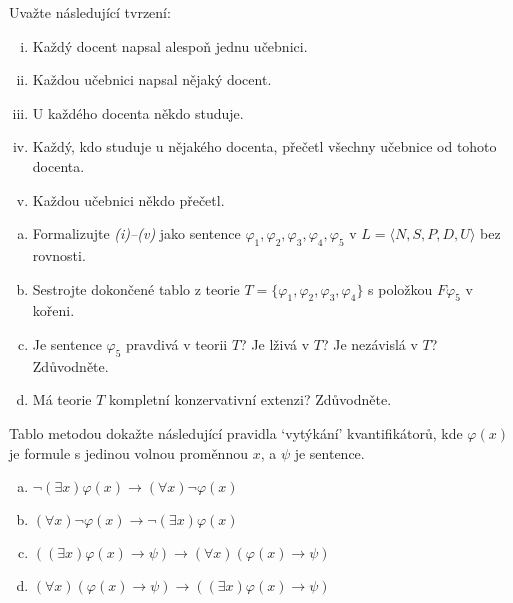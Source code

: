 \begin{problem}
    
    Uvažte následující tvrzení:
    \begin{enumerate}[(i)]\it
        \item Každý docent napsal alespoň jednu učebnici.
        \item Každou učebnici napsal nějaký docent.
        \item U každého docenta někdo studuje.
        \item Každý, kdo studuje u nějakého docenta, přečetl všechny učebnice od tohoto docenta.
        \item Každou učebnici někdo přečetl.
    \end{enumerate}    
    \begin{enumerate}[(a)]
        \item Formalizujte {\it(i)--(v)} jako sentence $\varphi_1,\varphi_2,\varphi_3,\varphi_4,\varphi_5$ v $L=\langle N, S, P, D, U\rangle$ bez rovnosti.
        \item Sestrojte dokončené tablo z teorie $T=\{\varphi_1,\varphi_2,\varphi_3,\varphi_4\}$ s položkou $F\varphi_5$ v kořeni.
        \item Je sentence $\varphi_5$ pravdivá v teorii $T$? Je lživá v $T$? Je nezávislá v $T$? Zdůvodněte.
        \item Má teorie $T$ kompletní konzervativní extenzi? Zdůvodněte.
    \end{enumerate}

\end{problem}


\begin{problem}
    
    Tablo metodou dokažte následující pravidla `vytýkání' kvantifikátorů, kde $\varphi(x)$ je formule s jedinou volnou proměnnou $x$, a $\psi$ je sentence.

    \vspace{-6pt}
    \begin{multicols}{2}
        \begin{enumerate}[(a)]        
            \item $\neg(\exists x)\varphi(x)\to (\forall x)\neg \varphi(x)$
            \item $(\forall x)\neg \varphi(x)\to \neg(\exists x)\varphi(x)$
            \item $((\exists x)\varphi(x)\to\psi)\to(\forall x)(\varphi(x)\to \psi)$       
            \item $(\forall x)(\varphi(x)\to\psi)\to((\exists x)\varphi(x)\to \psi)$            
        \end{enumerate}
    \end{multicols}
    \vspace{-6pt}
    
\end{problem}



